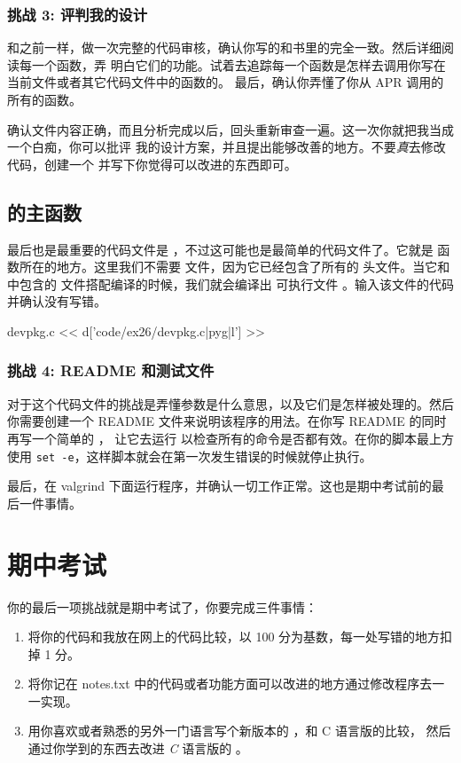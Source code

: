 \subsubsection{挑战 3: 评判我的设计}

和之前一样，做一次完整的代码审核，确认你写的和书里的完全一致。然后详细阅读每一个函数，弄
明白它们的功能。试着去追踪每一个函数是怎样去调用你写在当前文件或者其它代码文件中的函数的。
最后，确认你弄懂了你从 APR 调用的所有的函数。

确认文件内容正确，而且分析完成以后，回头重新审查一遍。这一次你就把我当成一个白痴，你可以批评
我的设计方案，并且提出能够改善的地方。不要\emph{真}去修改代码，创建一个  
并写下你觉得可以改进的东西即可。


\subsection{ 的主函数}

最后也是最重要的代码文件是 ，不过这可能也是最简单的代码文件了。它就是
  函数所在的地方。这里我们不需要  文件，因为它已经包含了所有的
 头文件。当它和  中包含的  文件搭配编译的时候，我们就会编译出
 可执行文件 。输入该文件的代码并确认没有写错。
 

\begin{code}{devpkg.c}
<< d['code/ex26/devpkg.c|pyg|l'] >>
\end{code}

\subsubsection{挑战 4: README 和测试文件}

对于这个代码文件的挑战是弄懂参数是什么意思，以及它们是怎样被处理的。然后你需要创建一个
README 文件来说明该程序的用法。在你写 README 的同时再写一个简单的 ，
让它去运行  以检查所有的命令是否都有效。在你的脚本最上方使用
\verb|set -e|，这样脚本就会在第一次发生错误的时候就停止执行。

最后，在 valgrind 下面运行程序，并确认一切工作正常。这也是期中考试前的最后一件事情。

\section{期中考试}

你的最后一项挑战就是期中考试了，你要完成三件事情：

\begin{enumerate}
\item 将你的代码和我放在网上的代码比较，以 100 分为基数，每一处写错的地方扣掉 1 分。
\item 将你记在 notes.txt 中的代码或者功能方面可以改进的地方通过修改程序去一一实现。
\item 用你喜欢或者熟悉的另外一门语言写个新版本的 ，和 C 语言版的比较，
    然后通过你学到的东西去改进 \emph{C} 语言版的 。
\end{enumerate}

